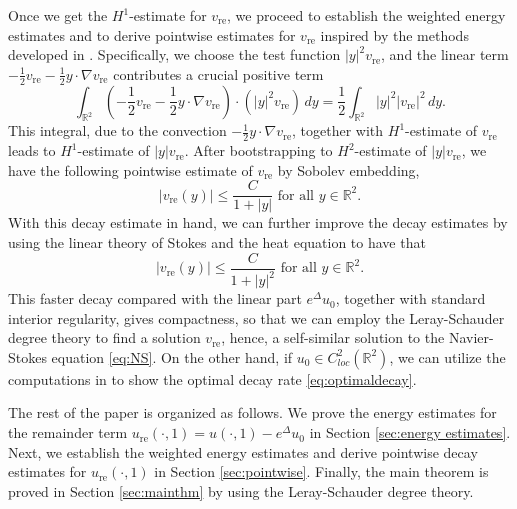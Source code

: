\documentclass[12pt]{amsart}
\numberwithin{equation}{section}              %
\theoremstyle{remark}
\begin{document}
	Once we get the $H^1$-estimate for $v_{\text{re}}$, we proceed to establish the weighted energy estimates and to derive  pointwise estimates for $v_{\text{re}}$ inspired by the methods developed in  \cite{Lai19}. Specifically, we choose the test function $|y|^2 v_{\text{re}}$, and the linear  term $-\frac{1}{2}v_{\text{re}} -\frac{1}{2}y\cdot \nabla v_{\text{re}}$
    contributes a crucial positive term  
    \begin{equation*}
				 \int_{\mathbb{R}^2} \left( -\frac{1}{2} v_{\text{re}} - \frac{1}{2} y \cdot \nabla v_{\text{re}} \right) \cdot (|y|^2 v_{\text{re}}) \, dy =\frac{1}{2} \int_{\mathbb{R}^2} |y|^2 |v_{\text{re}}|^2 \, dy.
			\end{equation*}
            This integral, due to the convection $- \frac{1}{2} y \cdot  \nabla v_{\text{re}}$, together with $H^1$-estimate of $v_{\text{re}}$  leads to 
            $H^1$-estimate of $|y| v_{\text{re}}$. After bootstrapping to $H^2$-estimate of $|y| v_{\text{re}}$, 
    we have the following pointwise estimate of $v_{\text{re}}$ by Sobolev embedding, 
	\begin{equation*}
		|v_{\text{re}}(y)| \leq \frac{C}{	1 + |y| } \textrm{ for all } y \in \mathbb{R}^2.
	\end{equation*}
	With this decay estimate in hand, we can further improve the decay estimates by  using the linear theory of Stokes and the heat equation to have that
	\begin{equation*}
		|v_{\text{re}} (y)| \leq \frac{C}{	1 + |y|^2 } \textrm{ for all } y \in \mathbb{R}^2.
	\end{equation*}
	This faster decay compared with the linear part $e^{\Delta}u_0$, together with standard interior regularity, gives compactness, so that we  can employ the Leray-Schauder degree theory to find a solution $v_{\textrm{re}}$, hence, a self-similar solution to the Navier-Stokes equation \eqref{eq:NS}. On the other hand, if $u_0\in C^2_{loc}(\mathbb{R}^2)$, we can utilize the computations in \cite{Brandolese09} to show the optimal decay rate \eqref{eq:optimaldecay}.
	
	
	The rest of the paper is organized as follows. We prove the energy estimates for the remainder term $u_{\text{re}} (\cdot,1)= u(\cdot,1) -  e^{\Delta}u_0$ in Section \ref{sec:energy estimates}. Next, we establish the weighted energy estimates and derive pointwise decay estimates for $u_{\text{re}} (\cdot,1)$  in Section \ref{sec:pointwise}. Finally,  the main theorem is proved in Section \ref{sec:mainthm} by using the Leray-Schauder degree theory.
	
\end{document}
